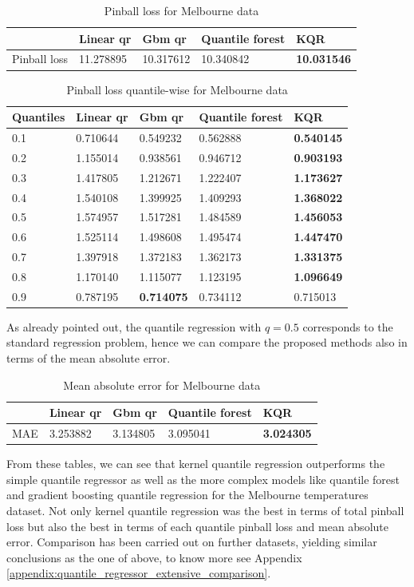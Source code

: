 \begin{table}[!h]
\caption{Pinball loss for Melbourne data}
\begin{tabular}{lllll}
    \toprule
     & Linear qr & Gbm qr & Quantile forest & KQR \\
    \midrule
    Pinball loss & 11.278895 & 10.317612 & 10.340842 & \textbf{10.031546} \\
    \bottomrule
    \end{tabular}
\end{table}

\begin{table}[!h]
    \caption{Pinball loss quantile-wise for Melbourne data}
    \begin{tabular}{lllll}
    \toprule
    Quantiles & Linear qr & Gbm qr & Quantile forest & KQR \\
    \midrule
    0.1 & 0.710644 & 0.549232 & 0.562888 & \textbf{0.540145} \\
    0.2 & 1.155014 & 0.938561 & 0.946712 & \textbf{0.903193} \\
    0.3 & 1.417805 & 1.212671 & 1.222407 & \textbf{1.173627} \\
    0.4 & 1.540108 & 1.399925 & 1.409293 & \textbf{1.368022} \\
    0.5 & 1.574957 & 1.517281 & 1.484589 & \textbf{1.456053} \\
    0.6 & 1.525114 & 1.498608 & 1.495474 & \textbf{1.447470} \\
    0.7 & 1.397918 & 1.372183 & 1.362173 & \textbf{1.331375} \\
    0.8 & 1.170140 & 1.115077 & 1.123195 & \textbf{1.096649} \\
    0.9 & 0.787195 & \textbf{0.714075} & 0.734112 & 0.715013 \\
    \bottomrule
    \end{tabular}
\end{table}
As already pointed out, the quantile regression with $q=0.5$ corresponds to the standard regression problem, hence we can compare the proposed methods also in terms of the mean absolute error.
\begin{table}[!h]
\caption{Mean absolute error for Melbourne data}
\begin{tabular}{lllll}
    \toprule
     & Linear qr & Gbm qr & Quantile forest & KQR \\
    \midrule
    MAE & 3.253882 & 3.134805 & 3.095041 & \textbf{3.024305} \\
    \bottomrule
    \end{tabular}
\end{table}  
From these tables, we can see that kernel quantile regression outperforms the simple quantile regressor as well as the more complex models like quantile forest and gradient boosting quantile regression for the Melbourne temperatures dataset. Not only kernel quantile regression was the best in terms of total pinball loss but also the best in terms of each quantile pinball loss and mean absolute error.
Comparison has been carried out on further datasets, yielding similar conclusions as the one of above, to know more see Appendix \ref{appendix:quantile_regressor_extensive_comparison}.

